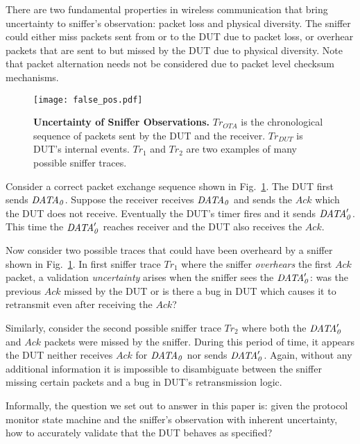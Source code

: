 There are two fundamental properties in wireless communication that bring
uncertainty to sniffer's observation: packet loss and physical diversity. The
sniffer could either miss packets sent from or to the DUT due to packet loss, or
overhear packets that are sent to but missed by the DUT due to physical
diversity. Note that packet alternation needs not be considered due to packet
level checksum mechanisms.

\begin{figure}[t!]
  \centering
  \texttt{[image: false\_pos.pdf]}
  \caption{\textbf{Uncertainty of Sniffer Observations.} $Tr_{OTA}$ is
    the chronological sequence of packets sent by the DUT and the receiver.
    $Tr_{DUT}$ is DUT's internal events. $Tr_1$ and $Tr_2$ are two examples of
    many possible sniffer traces.}
  \label{fig:sniffer_in_middle}
\end{figure}

Consider a correct packet exchange sequence shown in
Fig.~\ref{fig:sniffer_in_middle}. The DUT first sends $\it{DATA}_0$.  Suppose the
receiver receives $\it{DATA}_0$ and sends the $Ack$ which the DUT does not receive.
Eventually the DUT's timer fires and it sends $\it{DATA}'_0$.  This time the
$\it{DATA}'_0$ reaches receiver and the DUT also receives the $Ack$.

Now consider two possible traces that could have been overheard by a sniffer shown
in Fig.~\ref{fig:sniffer_in_middle}.
In first sniffer trace $Tr_1$ where the sniffer
\textit{overhears} the first $Ack$ packet, a validation \textit{uncertainty}
arises when the sniffer sees the $\it{DATA}'_0$: was the previous $Ack$ missed by the
DUT or is there a bug in DUT which causes it to retransmit even after receiving
the $Ack$?

Similarly, consider the second possible sniffer trace $Tr_2$
where both the $\it{DATA}'_0$ and $Ack$ packets were missed by the sniffer. During
this period of time, it appears the DUT neither receives $Ack$ for $\it{DATA}_0$ nor
sends $\it{DATA}'_0$. Again, without any additional information it is impossible to
disambiguate between the sniffer missing certain packets and a bug in DUT's
retransmission logic.

Informally, the question we set out to answer in this paper is: given the
protocol monitor state machine and the sniffer's observation with inherent
uncertainty, how to accurately validate that the DUT behaves as specified?
